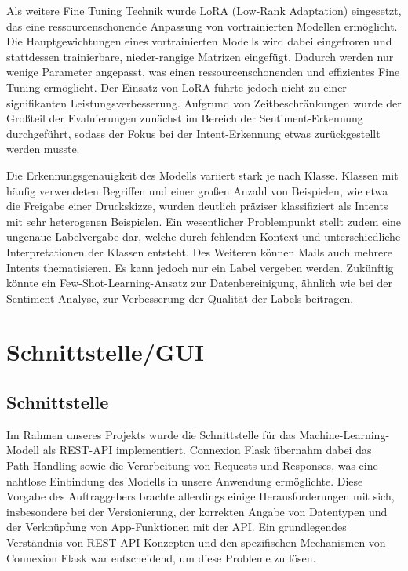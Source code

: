 Als weitere Fine Tuning Technik wurde LoRA (Low-Rank Adaptation) eingesetzt, das eine ressourcenschonende Anpassung von vortrainierten Modellen ermöglicht. Die Hauptgewichtungen eines vortrainierten Modells wird dabei eingefroren und stattdessen trainierbare, nieder-rangige Matrizen eingefügt. Dadurch werden nur wenige Parameter angepasst, was einen ressourcenschonenden und effizientes Fine Tuning ermöglicht. Der Einsatz von LoRA führte jedoch nicht zu einer signifikanten Leistungsverbesserung. Aufgrund von Zeitbeschränkungen wurde der Großteil der Evaluierungen zunächst im Bereich der Sentiment-Erkennung durchgeführt, sodass der Fokus bei der Intent-Erkennung etwas zurückgestellt werden musste. 

Die Erkennungsgenauigkeit des Modells variiert stark je nach Klasse. Klassen mit häufig verwendeten Begriffen und einer großen Anzahl von Beispielen, wie etwa die Freigabe einer Druckskizze, wurden deutlich präziser klassifiziert als Intents mit sehr heterogenen Beispielen. Ein wesentlicher Problempunkt stellt zudem eine ungenaue Labelvergabe dar, welche durch fehlenden Kontext und unterschiedliche Interpretationen der Klassen entsteht. Des Weiteren können Mails auch mehrere Intents thematisieren. Es kann jedoch nur ein Label vergeben werden. Zukünftig könnte ein Few-Shot-Learning-Ansatz zur Datenbereinigung, ähnlich wie bei der Sentiment-Analyse, zur Verbesserung der Qualität der Labels beitragen. 



\section{Schnittstelle/GUI}

\subsection{Schnittstelle}

Im Rahmen unseres Projekts wurde die Schnittstelle für das Machine-Learning-Modell als REST-API implementiert.
Connexion Flask übernahm dabei das Path-Handling sowie die Verarbeitung von Requests und Responses, was eine
nahtlose Einbindung des Modells in unsere Anwendung ermöglichte. Diese Vorgabe des Auftraggebers brachte
allerdings einige Herausforderungen mit sich, insbesondere bei der Versionierung, der korrekten Angabe
von Datentypen und der Verknüpfung von App-Funktionen mit der API. Ein grundlegendes Verständnis von
REST-API-Konzepten und den spezifischen Mechanismen von Connexion Flask war entscheidend, um diese Probleme
zu lösen. 

